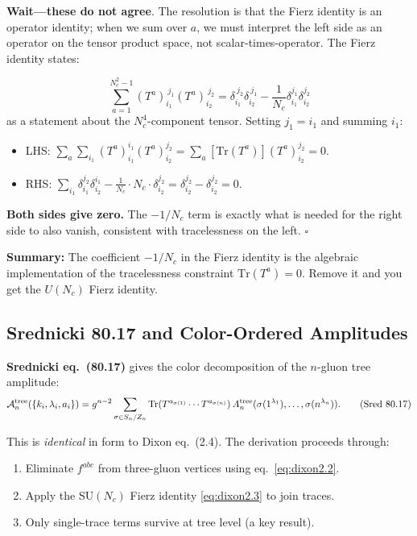 \textbf{Wait---these do not agree}. The resolution is that the Fierz identity is an operator identity; when we sum over $a$, we must interpret the left side as an operator on the tensor product space, not scalar-times-operator. The Fierz identity states:

\begin{equation}
\boxed{\sum_{a=1}^{N_c^2-1}(T^a)_{i_1}^{\ j_1}(T^a)_{i_2}^{\ j_2}
  = \delta_{i_1}^{\ j_2}\delta_{i_2}^{\ j_1}
  - \frac{1}{N_c}\delta_{i_1}^{j_1}\delta_{i_2}^{j_2}}
\end{equation}
as a statement about the $N_c^4$-component tensor. Setting $j_1=i_1$ and summing $i_1$:
\begin{itemize}
  \item LHS: $\sum_a\sum_{i_1}(T^a)_{i_1}^{i_1}(T^a)_{i_2}^{j_2}=\sum_a[\mathrm{Tr}(T^a)](T^a)_{i_2}^{j_2}=0$.
  \item RHS: $\sum_{i_1}\delta_{i_1}^{j_2}\delta_{i_2}^{i_1}-\frac{1}{N_c}\cdot N_c\cdot\delta_{i_2}^{j_2}=\delta_{i_2}^{j_2}-\delta_{i_2}^{j_2}=0$.
\end{itemize}
\textbf{Both sides give zero.} The $-1/N_c$ term is exactly what is needed for the right side to also vanish, consistent with tracelessness on the left. $\square$

\textbf{Summary:} The coefficient $-1/N_c$ in the Fierz identity is the algebraic implementation of the tracelessness constraint $\mathrm{Tr}(T^a)=0$. Remove it and you get the $U(N_c)$ Fierz identity.

\subsection{Srednicki 80.17 and Color-Ordered Amplitudes}
\label{sec:color-ordered}

\textbf{Srednicki eq.~(80.17)} gives the color decomposition of the $n$-gluon
tree amplitude:
\begin{equation}
  \mathcal{A}_n^{\rm tree}(\{k_i,\lambda_i,a_i\})
  = g^{n-2}\sum_{\sigma\in S_n/Z_n}
  \mathrm{Tr}(T^{a_{\sigma(1)}}\cdots T^{a_{\sigma(n)}})\,
  A_n^{\rm tree}(\sigma(1^{\lambda_1}),\ldots,\sigma(n^{\lambda_n})).
  \tag{Sred 80.17}
\end{equation}

This is \emph{identical} in form to Dixon eq.~(2.4). The derivation proceeds through:
\begin{enumerate}
  \item Eliminate $f^{abc}$ from three-gluon vertices using eq.~\eqref{eq:dixon2.2}.
  \item Apply the SU$(N_c)$ Fierz identity \eqref{eq:dixon2.3} to join traces.
  \item Only single-trace terms survive at tree level (a key result).
\end{enumerate}

